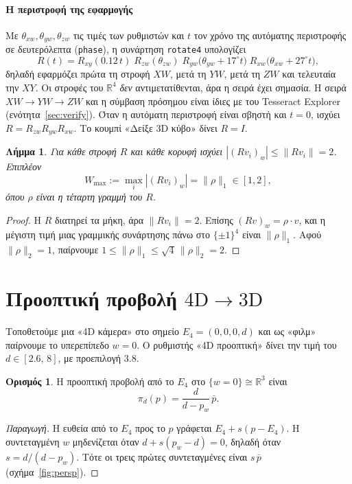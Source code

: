 \documentclass[10pt,a4paper]{article}
\theoremstyle{plain}
\newtheorem{lemma}[theorem]{Λήμμα}
\theoremstyle{definition}
\newtheorem{definition}[theorem]{Ορισμός}
\newcommand{\R}{\mathbb{R}}
\newcommand{\code}[1]{\texttt{#1}}
\newcommand{\eng}[1]{\textenglish{#1}}
\begin{document}
\paragraph{Η περιστροφή της εφαρμογής} Με $\theta_{xw},\theta_{yw},\theta_{zw}$ τις τιμές των ρυθμιστών και $t$ τον χρόνο της αυτόματης περιστροφής σε δευτερόλεπτα (\code{phase}), η συνάρτηση \code{rotate4} υπολογίζει
\begin{equation}\label{eq:R}
R(t)=R_{xy}(0.12\,t)\;R_{zw}(\theta_{zw})\;R_{yw}\!\bigl(\theta_{yw}+17^\circ t\bigr)\;R_{xw}\!\bigl(\theta_{xw}+27^\circ t\bigr),
\end{equation}
δηλαδή εφαρμόζει πρώτα τη στροφή $XW$, μετά τη $YW$, μετά τη $ZW$ και τελευταία την $XY$. Οι στροφές του $\R^4$ \emph{δεν} αντιμετατίθενται, άρα η σειρά έχει σημασία. Η σειρά $XW\to YW\to ZW$ και η σύμβαση πρόσημου είναι ίδιες με του \eng{Tesseract Explorer} (ενότητα~\ref{sec:verify}). Όταν η αυτόματη περιστροφή είναι σβηστή και $t=0$, ισχύει $R=R_{zw}R_{yw}R_{xw}$. Το κουμπί «Δείξε 3D κύβο» δίνει $R=I$.

\begin{lemma}\label{lem:wbound}
Για κάθε στροφή $R$ και κάθε κορυφή ισχύει $|(Rv_i)_w|\le\|Rv_i\|=2$. Επιπλέον
\[
W_{\max}:=\max_i|(Rv_i)_w|=\|\rho\|_1\in[1,2],
\]
όπου $\rho$ είναι η τέταρτη γραμμή του $R$.
\end{lemma}
\begin{proof}
Η $R$ διατηρεί τα μήκη, άρα $\|Rv_i\|=2$. Επίσης $(Rv)_w=\rho\cdot v$, και η μέγιστη τιμή μιας γραμμικής συνάρτησης πάνω στο $\{\pm1\}^4$ είναι $\|\rho\|_1$. Αφού $\|\rho\|_2=1$, παίρνουμε $1\le\|\rho\|_1\le\sqrt4\,\|\rho\|_2=2$.
\end{proof}

\section{Προοπτική προβολή \texorpdfstring{$4\mathrm{D}\to3\mathrm{D}$}{4D→3D}}\label{sec:persp}
Τοποθετούμε μια «4D κάμερα» στο σημείο $E_4=(0,0,0,d)$ και ως «φιλμ» παίρνουμε το υπερεπίπεδο $w=0$. Ο ρυθμιστής «4D προοπτική» δίνει την τιμή του $d\in[2.6,\,8]$, με προεπιλογή $3.8$.

\begin{definition}
Η προοπτική προβολή από το $E_4$ στο $\{w=0\}\cong\R^3$ είναι
\begin{equation}\label{eq:pi}
\pi_d(p)=\frac{d}{d-p_w}\,\bar p .
\end{equation}
\end{definition}
\begin{proof}[Παραγωγή]
Η ευθεία από το $E_4$ προς το $p$ γράφεται $E_4+s(p-E_4)$. Η συντεταγμένη $w$ μηδενίζεται όταν $d+s(p_w-d)=0$, δηλαδή όταν $s=d/(d-p_w)$. Τότε οι τρεις πρώτες συντεταγμένες είναι $s\,\bar p$ (σχήμα~\ref{fig:persp}).
\end{proof}
\end{document}
